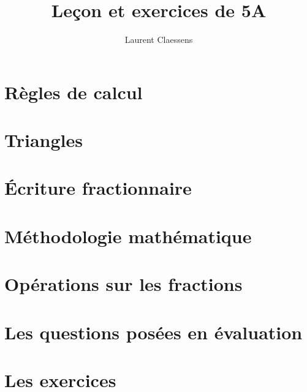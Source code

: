 \documentclass[a4paper,12pt]{book}
\begin{document}

\thispagestyle{empty}

\title{Leçon et exercices de 5A}
\author{Laurent Claessens}
\maketitle


\tableofcontents


\chapter{Règles de calcul}


\chapter{Triangles}


\chapter{Écriture fractionnaire}


\chapter{Méthodologie mathématique}


\chapter{Opérations sur les fractions}


\chapter{Les questions posées en évaluation}


\chapter{Les exercices}




\end{document}
